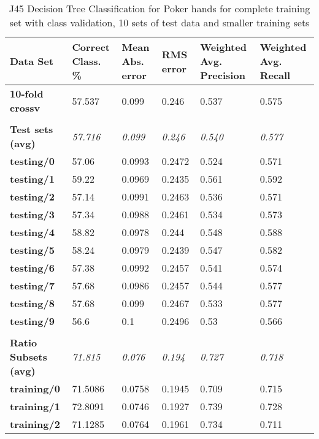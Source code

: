 \documentclass[11pt, a4paper]{article}
\begin{document}
\begin{table}[htbp]
  \centering
  \begin{tabular}{p{3cm}p{1.5cm}p{1.5cm}p{1.5cm}p{1.5cm}p{1.5cm}}
    
    \toprule
    \textbf{Data Set} & Correct Class. \% & Mean Abs. error & RMS error & Weighted Avg. Precision & Weighted Avg. Recall \\
    \midrule
    \textbf{10-fold crossv} & 57.537 & 0.099 & 0.246 & 0.537 & 0.575 \\
    \textbf{} &       &       &       &       &  \\
    \textbf{Test sets (avg)} & \textit{57.716} & \textit{0.099} & \textit{0.246} & \textit{0.540} & \textit{0.577} \\
    \textbf{   testing/0} & 57.06 & 0.0993 & 0.2472 & 0.524 & 0.571 \\
    \textbf{   testing/1} & 59.22 & 0.0969 & 0.2435 & 0.561 & 0.592 \\
    \textbf{   testing/2} & 57.14 & 0.0991 & 0.2463 & 0.536 & 0.571 \\
    \textbf{   testing/3} & 57.34 & 0.0988 & 0.2461 & 0.534 & 0.573 \\
    \textbf{   testing/4} & 58.82 & 0.0978 & 0.244 & 0.548 & 0.588 \\
    \textbf{   testing/5} & 58.24 & 0.0979 & 0.2439 & 0.547 & 0.582 \\
    \textbf{   testing/6} & 57.38 & 0.0992 & 0.2457 & 0.541 & 0.574 \\
    \textbf{   testing/7} & 57.68 & 0.0986 & 0.2457 & 0.544 & 0.577 \\
    \textbf{   testing/8} & 57.68 & 0.099 & 0.2467 & 0.533 & 0.577 \\
    \textbf{   testing/9} & 56.6  & 0.1   & 0.2496 & 0.53  & 0.566 \\
    \textbf{} &       &       &       &       &  \\
    \textbf{Ratio Subsets (avg)} & \textit{71.815} & \textit{0.076} & \textit{0.194} & \textit{0.727} & \textit{0.718} \\
    \textbf{   training/0} & 71.5086 & 0.0758 & 0.1945 & 0.709 & 0.715 \\
    \textbf{   training/1} & 72.8091 & 0.0746 & 0.1927 & 0.739 & 0.728 \\
    \textbf{   training/2} & 71.1285 & 0.0764 & 0.1961 & 0.734 & 0.711 \\
    \bottomrule
    \end{tabular}%

\caption{J45 Decision Tree Classification for Poker hands for complete training set with class validation, 10 sets of test data and smaller training sets}   
  \label{tab:dtresults}%
\end{table}%
\end{document}
